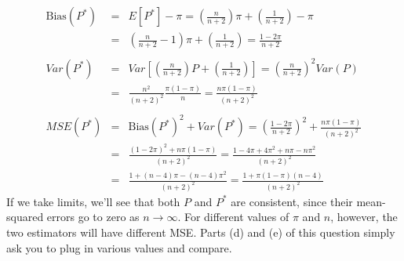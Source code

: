 \documentclass[addpoints,12pt]{exam}\usepackage[]{graphicx}\usepackage[]{color}
\begin{document}
\begin{questions}
\begin{solution}
\begin{eqnarray*}
		\mbox{Bias}(P^*) &=& E[P^*] - \pi =  \left(\frac{n}{n+2}\right)\pi + \left(\frac{1}{n+2}\right) - \pi\\
			&=&\left(\frac{n}{n+2} -1\right)\pi + \left(\frac{1}{n+2}\right) = \frac{1-2\pi}{n+2}\\\\
		Var(P^*) &=& Var\left[  \left(\frac{n}{n+2}\right)P + \left(\frac{1}{n+2}\right)\right] = \left(\frac{n}{n+2}\right)^2 Var(P)\\
		&=& \frac{n^2}{(n+2)^2} \frac{\pi(1-\pi)}{n} = \frac{n\pi(1-\pi)}{(n+2)^2}\\ \\ 
		MSE(P^*) &=& \mbox{Bias}(P^*)^2 + Var(P^*) = \left(\frac{1-2\pi}{n+2}\right)^2 + \frac{n\pi(1-\pi)}{(n+2)^2}\\
			&=& \frac{(1-2\pi)^2 + n\pi(1-\pi)}{(n+2)^2} = \frac{1 - 4\pi + 4\pi^2 + n\pi - n\pi^2}{(n+2)^2}\\
			&=& \frac{1 + (n-4)\pi - (n-4)\pi^2 }{(n+2)^2} =\frac{1 + \pi(1-\pi)(n-4)}{(n+2)^2}
	\end{eqnarray*}
	If we take limits, we'll see that both $P$ and $P^*$ are consistent, since their mean-squared errors go to zero as $n\rightarrow  \infty$. For different values of $\pi$ and $n$, however, the two estimators will have different MSE. Parts (d) and (e) of this question simply ask you to plug in various values and compare.


\end{solution}
\end{questions}
\end{document}
